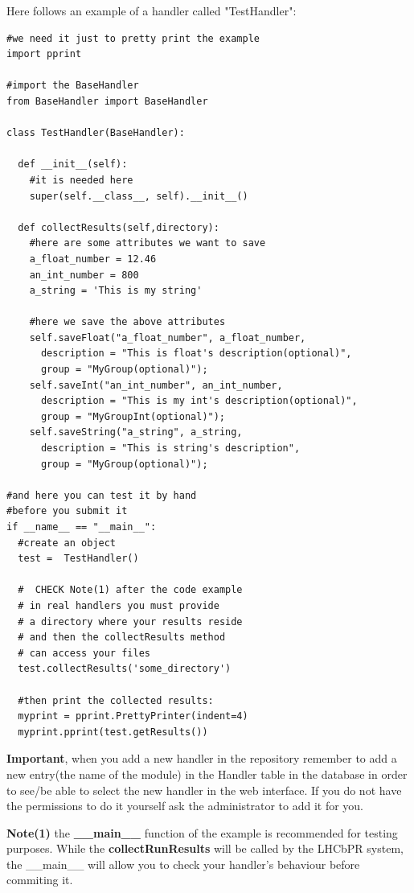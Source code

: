 \documentclass{lhcbnote}
\begin{document}
\vspace{2 mm}

Here follows an example of a handler called "TestHandler":

\begin{verbatim}
#we need it just to pretty print the example
import pprint

#import the BaseHandler
from BaseHandler import BaseHandler

class TestHandler(BaseHandler):

  def __init__(self):
    #it is needed here
    super(self.__class__, self).__init__()

  def collectResults(self,directory):
    #here are some attributes we want to save
    a_float_number = 12.46
    an_int_number = 800
    a_string = 'This is my string'

    #here we save the above attributes
    self.saveFloat("a_float_number", a_float_number,
      description = "This is float's description(optional)",
      group = "MyGroup(optional)");
    self.saveInt("an_int_number", an_int_number,
      description = "This is my int's description(optional)",
      group = "MyGroupInt(optional)");
    self.saveString("a_string", a_string,
      description = "This is string's description",
      group = "MyGroup(optional)");

#and here you can test it by hand
#before you submit it
if __name__ == "__main__":
  #create an object
  test =  TestHandler()
   
  #  CHECK Note(1) after the code example
  # in real handlers you must provide
  # a directory where your results reside
  # and then the collectResults method 
  # can access your files
  test.collectResults('some_directory')
    
  #then print the collected results:
  myprint = pprint.PrettyPrinter(indent=4)
  myprint.pprint(test.getResults())
\end{verbatim}

{\bf Important}, when you add a new handler in the repository remember to add a new entry(the name of the module) in the Handler table in the database
in order to see/be able to select the new handler in the web interface. If you do not have the permissions to do it yourself ask the administrator to add it for you.

\vspace {2 mm}

\textbf{Note(1)} the \textbf{\_\_main\_\_} function of the example is recommended for testing purposes. While the \textbf{collectRunResults} will be called by the LHCbPR system, the \_\_main\_\_ will allow you to check your handler's behaviour before commiting it.
\end{document}
